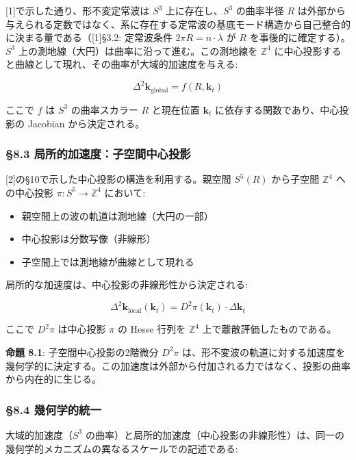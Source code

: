 \documentclass[
  a4paper,11pt]{ltjsarticle}
\providecommand{\tightlist}{%
  \setlength{\itemsep}{0pt}\setlength{\parskip}{0pt}}
\theoremstyle{definition}
\theoremstyle{remark}
\begin{document}
{[}1{]}で示した通り、形不変定常波は \(S^3\) 上に存在し、\(S^3\)
の曲率半径 \(R\)
は外部から与えられる定数ではなく、系に存在する定常波の基底モード構造から自己整合的に決まる量である（{[}1{]}§3.2:
定常波条件 \(2\pi R = n \cdot \lambda\) が \(R\)
を事後的に確定する）。\(S^3\)
上の測地線（大円）は曲率に沿って進む。この測地線を \(\mathbb{Z}^4\)
に中心投影すると曲線として現れ、その曲率が大域的加速度を与える:

\[\Delta^2\mathbf{k}_{\text{global}} = f(R, \mathbf{k}_t)\]

ここで \(f\) は \(S^3\) の曲率スカラー \(R\) と現在位置 \(\mathbf{k}_t\)
に依存する関数であり、中心投影の Jacobian から決定される。

\subsubsection{§8.3
局所的加速度：子空間中心投影}\label{ux5c40ux6240ux7684ux52a0ux901fux5ea6ux5b50ux7a7aux9593ux4e2dux5fc3ux6295ux5f71}

{[}2{]}の§10で示した中心投影の構造を利用する。親空間 \(S^5(R)\)
から子空間 \(\mathbb{Z}^4\) への中心投影 \(\pi : S^5 \to \mathbb{Z}^4\)
において:

\begin{itemize}
\tightlist
\item
  親空間上の波の軌道は測地線（大円の一部）
\item
  中心投影は分数写像（非線形）
\item
  子空間上では測地線が曲線として現れる
\end{itemize}

局所的な加速度は、中心投影の非線形性から決定される:

\[\Delta^2\mathbf{k}_{\text{local}}(\mathbf{k}_t) = D^2\pi(\mathbf{k}_t) \cdot \Delta\mathbf{k}_t\]

ここで \(D^2\pi\) は中心投影 \(\pi\) の Hesse 行列を \(\mathbb{Z}^4\)
上で離散評価したものである。

\textbf{命題 8.1}: 子空間中心投影の2階微分 \(D^2\pi\)
は、形不変波の軌道に対する加速度を幾何学的に決定する。この加速度は外部から付加される力ではなく、投影の曲率から内在的に生じる。

\subsubsection{§8.4
幾何学的統一}\label{ux5e7eux4f55ux5b66ux7684ux7d71ux4e00}

大域的加速度（\(S^3\)
の曲率）と局所的加速度（中心投影の非線形性）は、同一の幾何学的メカニズムの異なるスケールでの記述である:
\end{document}
